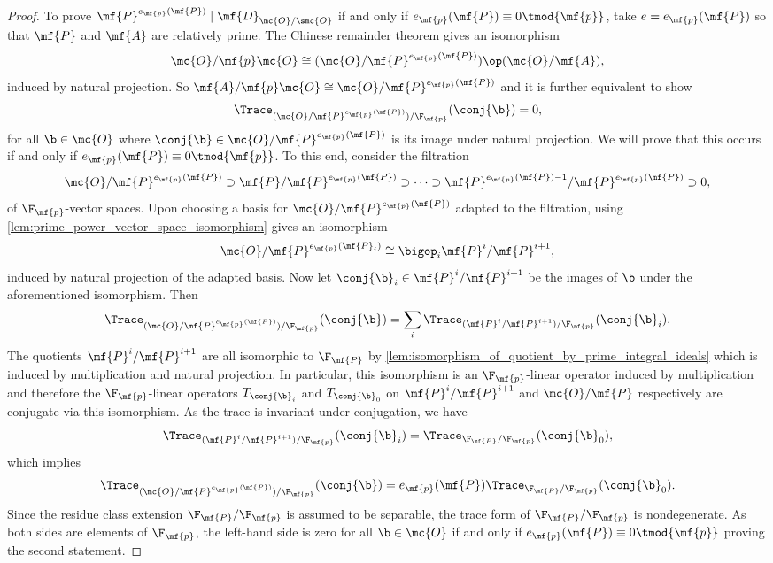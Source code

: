 \documentclass[12pt]{article}
\begin{document}
\begin{proof}
        To prove \(\mf{P}^{e_{\mf{p}}(\mf{P})} \mid \mf{D}_{\mc{O}/\smc{O}}\) if and only if \(e_{\mf{p}}(\mf{P}) \equiv 0 \tmod{\mf{p}}\), take \(e = e_{\mf{p}}(\mf{P})\) so that \(\mf{P}\) and \(\mf{A}\) are relatively prime. The Chinese remainder theorem gives an isomorphism
        \[
          \mc{O}/\mf{p}\mc{O} \cong (\mc{O}/\mf{P}^{e_{\mf{p}}(\mf{P})}) \op (\mc{O}/\mf{A}),
        \]
        induced by natural projection. So \(\mf{A}/\mf{p}\mc{O} \cong \mc{O}/\mf{P}^{e_{\mf{p}}(\mf{P})}\) and it is further equivalent to show
        \[
          \Trace_{(\mc{O}/\mf{P}^{e_{\mf{p}}(\mf{P})})/\F_{\mf{p}}}(\conj{\b}) = 0,
        \]
        for all \(\b \in \mc{O}\) where \(\conj{\b} \in \mc{O}/\mf{P}^{e_{\mf{p}}(\mf{P})}\) is its image under natural projection. We will prove that this occurs if and only if \(e_{\mf{p}}(\mf{P}) \equiv 0 \tmod{\mf{p}}\). To this end, consider the filtration
        \[
          \mc{O}/\mf{P}^{e_{\mf{p}}(\mf{P})} \supset \mf{P}/\mf{P}^{e_{\mf{p}}(\mf{P})} \supset \cdots \supset \mf{P}^{e_{\mf{p}}(\mf{P})-1}/\mf{P}^{e_{\mf{p}}(\mf{P})} \supset 0,
        \]
        of \(\F_{\mf{p}}\)-vector spaces. Upon choosing a basis for \(\mc{O}/\mf{P}^{e_{\mf{p}}(\mf{P})}\) adapted to the filtration, using \cref{lem:prime_power_vector_space_isomorphism} gives an isomorphism
        \[
          \mc{O}/\mf{P}^{e_{\mf{p}}(\mf{P}_{i})} \cong \bigop_{i}\mf{P}^{i}/\mf{P}^{i+1},
        \]
        induced by natural projection of the adapted basis. Now let \(\conj{\b}_{i} \in \mf{P}^{i}/\mf{P}^{i+1}\) be the images of \(\b\) under the aforementioned isomorphism. Then
        \[
          \Trace_{(\mc{O}/\mf{P}^{e_{\mf{p}}(\mf{P})})/\F_{\mf{p}}}(\conj{\b}) = \sum_{i}\Trace_{(\mf{P}^{i}/\mf{P}^{i+1})/\F_{\mf{p}}}(\conj{\b}_{i}).
        \]
        The quotients \(\mf{P}^{i}/\mf{P}^{i+1}\) are all isomorphic to \(\F_{\mf{P}}\) by \cref{lem:isomorphism_of_quotient_by_prime_integral_ideals} which is induced by multiplication and natural projection. In particular, this isomorphism is an \(\F_{\mf{p}}\)-linear operator induced by multiplication and therefore the \(\F_{\mf{p}}\)-linear operators \(T_{\conj{\b}_{i}}\) and \(T_{\conj{\b}_{0}}\) on \(\mf{P}^{i}/\mf{P}^{i+1}\) and \(\mc{O}/\mf{P}\) respectively are conjugate via this isomorphism. As the trace is invariant under conjugation, we have
        \[
          \Trace_{(\mf{P}^{i}/\mf{P}^{i+1})/\F_{\mf{p}}}(\conj{\b}_{i}) = \Trace_{\F_{\mf{P}}/\F_{\mf{p}}}(\conj{\b}_{0}),
        \]
        which implies
        \[
          \Trace_{(\mc{O}/\mf{P}^{e_{\mf{p}}(\mf{P})})/\F_{\mf{p}}}(\conj{\b}) = e_{\mf{p}}(\mf{P})\Trace_{\F_{\mf{P}}/\F_{\mf{p}}}(\conj{\b}_{0}).
        \]
        Since the residue class extension \(\F_{\mf{P}}/\F_{\mf{p}}\) is assumed to be separable, the trace form of \(\F_{\mf{P}}/\F_{\mf{p}}\) is nondegenerate. As both sides are elements of \(\F_{\mf{p}}\), the left-hand side is zero for all \(\b \in \mc{O}\) if and only if \(e_{\mf{p}}(\mf{P}) \equiv 0 \tmod{\mf{p}}\) proving the second statement.


\end{proof}
\end{document}
